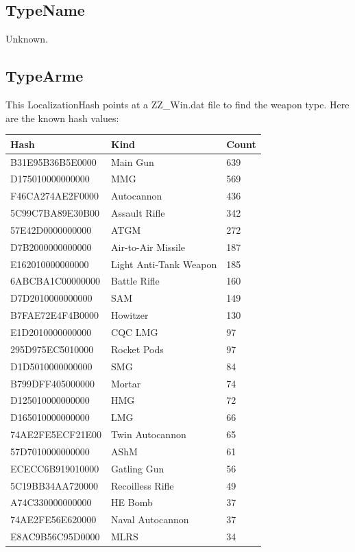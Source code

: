 \documentclass{article}
\begin{document}
\subsection{TypeName}

Unknown.

\subsection{TypeArme}

This LocalizationHash points at a ZZ\_Win.dat file to find the weapon type. Here are the known hash values:

\begin{center}
    \begin{tabular}{ | l | l | l |}
    \hline
	Hash & Kind & Count\\ \hline
	B31E95B36B5E0000 & Main Gun & 639\\
	D175010000000000 & MMG & 569\\
	F46CA274AE2F0000 & Autocannon & 436\\
	5C99C7BA89E30B00 & Assault Rifle & 342\\
	57E42D0000000000 & ATGM & 272\\
	D7B2000000000000 & Air-to-Air Missile & 187\\
	E162010000000000 & Light Anti-Tank Weapon & 185\\
	6ABCBA1C00000000 & Battle Rifle & 160\\
	D7D2010000000000 & SAM & 149\\
	B7FAE72E4F4B0000 & Howitzer & 130\\
	E1D2010000000000 & CQC LMG & 97\\
	295D975EC5010000 & Rocket Pods & 97\\
	D1D5010000000000 & SMG & 84\\
	B799DFF405000000 & Mortar & 74\\
	D125010000000000 & HMG & 72\\
	D165010000000000 & LMG & 66\\
	74AE2FE5ECF21E00 & Twin Autocannon & 65\\
	57D7010000000000 & AShM & 61\\
	ECECC6B919010000 & Gatling Gun & 56\\
	5C19BB34AA720000 & Recoilless Rifle & 49\\
	A74C330000000000 & HE Bomb & 37\\
	74AE2FE56E620000 & Naval Autocannon & 37\\
	E8AC9B56C95D0000 & MLRS & 34\\

\end{tabular}
\end{center}
\end{document}
